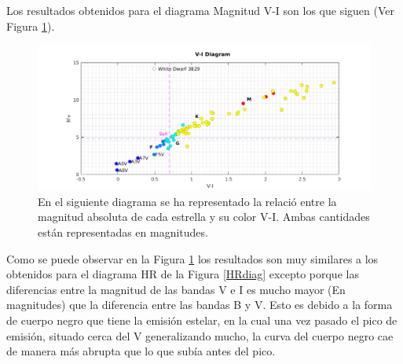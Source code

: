\hspace*{12pt}Los resultados obtenidos para el diagrama Magnitud V-I son los que siguen (Ver Figura \ref{VIdiag}).

	\begin{figure}[!htbp]
		\centering
		\begin{center}
			\includegraphics[width=15cm]{Figures/VIdiagram.png}
		\end{center}
		\caption{\footnotesize{En el siguiente diagrama se ha representado la relaci\'{o} entre la magnitud absoluta de cada estrella y su color V-I. Ambas cantidades est\'{a}n representadas en magnitudes.}}
		\label{VIdiag}
		\end{figure}

\hspace*{12pt} Como se puede observar en la Figura \ref{VIdiag} los resultados son muy similares a los obtenidos para el diagrama HR de la Figura \ref{HRdiag} excepto porque las diferencias entre la magnitud de las bandas V e I es mucho mayor (En magnitudes) que la diferencia entre las bandas B y V. Esto es debido a la forma de cuerpo negro que tiene la emisi\'{o}n estelar, en la cual una vez pasado el pico de emisi\'{o}n, situado cerca del V generalizando mucho, la curva del cuerpo negro cae de manera m\'{a}s abrupta que lo que sub\'{i}a antes del pico.